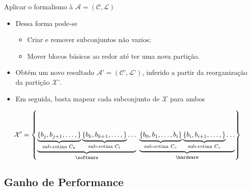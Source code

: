    \begin{frame}{Aplicar o formalismo à $\mathcal{A} = (\mathcal{C}, \mathcal{L})$}
      \begin{itemize}

         \item Dessa forma pode-se
            \begin{itemize}
               \item Criar e remover subconjuntos não vazios;
               \item Mover blocos básicos ao redor até ter uma nova partição.
            \end{itemize}

         \item Obtém um novo resultado $ \mathcal{A}’ = (\mathcal{C}’, \mathcal{L}’) $, inferido a partir da reorganização da partição $ \mathcal{X}’ $.

            \bigskip

         \item Em seguida, basta mapear cada subconjunto de $ \mathcal{X} $ para ambos \hs

      \end{itemize}
         { \footnotesize
         \begin{equation}
            \mathcal{X}'   = \left \{
            \underbrace{
               \underbrace{
                  \left \{ b_j, b_{j+1}, \dots, \right \}
               }_{\text{sub-rotina }C_k}
               \underbrace{
                  \left \{ b_k, b_{k+1}, \dots, \right \}
               }_{\text{sub-rotina }C_l}
               \dots
            }_{\text{\software}}
            \
            \underbrace{
               \underbrace{
                  \left \{ b_0, b_1, \dots, b_i \right \}
               }_{\text{sub-rotina }C_r}
               \underbrace{
                  \left \{ b_i, b_{i+1}, \dots, \right \}
               }_{\text{sub-rotina }C_s}
               \dots
            }_{\text{\hardware}}
            \right \} \label{eq:part_final}
         \end{equation}
         }
   \end{frame}


   \subsection{Ganho de Performance}

